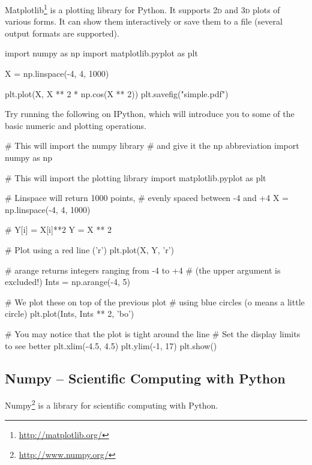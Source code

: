 Matplotlib\footnote{\url{http://matplotlib.org/}} is a plotting library for Python. It supports \textsc{2d} and \textsc{3d} plots of various forms. It can show them interactively or save them to a file (several output formats are supported).

\begin{python}
import numpy as np
import matplotlib.pyplot as plt

X = np.linspace(-4, 4, 1000)

plt.plot(X, X ** 2 * np.cos(X ** 2))
plt.savefig("simple.pdf")
\end{python}


\begin{exercise}
Try running the following on IPython, which will introduce you to some of the basic numeric and plotting operations.

\begin{python}
# This will import the numpy library
# and give it the np abbreviation
import numpy as np

# This will import the plotting library
import matplotlib.pyplot as plt

# Linspace will return 1000 points,
# evenly spaced between -4 and +4
X = np.linspace(-4, 4, 1000)

# Y[i] = X[i]**2
Y = X ** 2

# Plot using a red line ('r')
plt.plot(X, Y, 'r')

# arange returns integers ranging from -4 to +4
# (the upper argument is excluded!)
Ints = np.arange(-4, 5)

# We plot these on top of the previous plot
# using blue circles (o means a little circle)
plt.plot(Ints, Ints ** 2, 'bo')

# You may notice that the plot is tight around the line
# Set the display limits to see better
plt.xlim(-4.5, 4.5)
plt.ylim(-1, 17)
plt.show()
\end{python}
\end{exercise}


\subsection{Numpy -- Scientific Computing with Python}

Numpy\footnote{\url{http://www.numpy.org/}} is a library for scientific computing with Python.

